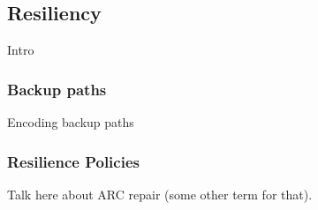 \subsection{Resiliency}
Intro

\subsubsection{Backup paths}
Encoding backup paths

\subsubsection{Resilience Policies}
Talk here about ARC repair (some other term for that).